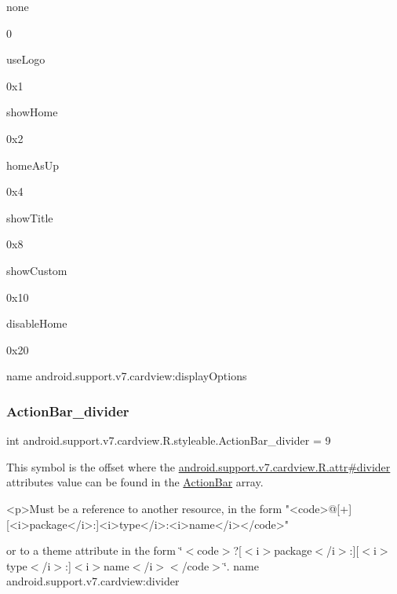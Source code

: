 {\ttfamily none}

0

{\ttfamily use\+Logo}

0x1

{\ttfamily show\+Home}

0x2

{\ttfamily home\+As\+Up}

0x4

{\ttfamily show\+Title}

0x8

{\ttfamily show\+Custom}

0x10

{\ttfamily disable\+Home}

0x20

name android.\+support.\+v7.\+cardview\+:display\+Options \mbox{\label{classandroid_1_1support_1_1v7_1_1cardview_1_1R_1_1styleable_ae505313e35211856966cf984c33181c7}} 
\subsubsection{\texorpdfstring{Action\+Bar\+\_\+divider}{ActionBar\_divider}}
{\footnotesize\ttfamily int android.\+support.\+v7.\+cardview.\+R.\+styleable.\+Action\+Bar\+\_\+divider = 9\hspace{0.3cm}{\ttfamily [static]}}

This symbol is the offset where the \hyperlink{classandroid_1_1support_1_1v7_1_1cardview_1_1R_1_1attr_af372fbb85ebef799e994b3e8ddd80ffc}{android.\+support.\+v7.\+cardview.\+R.\+attr\#divider} attribute\textquotesingle{}s value can be found in the \hyperlink{classandroid_1_1support_1_1v7_1_1cardview_1_1R_1_1styleable_a0cbf7f776e31f78bb0a2b558daf176f8}{Action\+Bar} array.

\begin{DoxyVerb}      <p>Must be a reference to another resource, in the form "<code>@[+][<i>package</i>:]<i>type</i>:<i>name</i></code>"
\end{DoxyVerb}
 or to a theme attribute in the form \char`\"{}$<$code$>$?\mbox{[}$<$i$>$package$<$/i$>$\+:\mbox{]}\mbox{[}$<$i$>$type$<$/i$>$\+:\mbox{]}$<$i$>$name$<$/i$>$$<$/code$>$\char`\"{}.  name android.\+support.\+v7.\+cardview\+:divider \mbox{\label{classandroid_1_1support_1_1v7_1_1cardview_1_1R_1_1styleable_aec9fae25c89bd5a070600e38f0b55df7}} 
